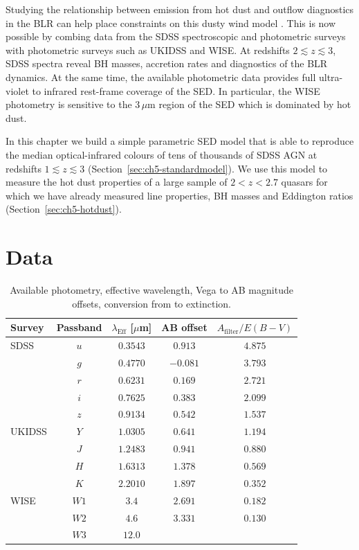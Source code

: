 Studying the relationship between emission from hot dust and outflow diagnostics in the BLR can help place constraints on this dusty wind model \citep[e.g.][]{wang13}. 
This is now possible by combing data from the SDSS spectroscopic and photometric surveys with photometric surveys such as UKIDSS and WISE. 
At redshifts $2\lesssim z \lesssim3$, SDSS spectra reveal BH masses, accretion rates and diagnostics of the BLR dynamics. 
At the same time, the available photometric data provides full ultra-violet to infrared rest-frame coverage of the SED.
In particular, the WISE photometry is sensitive to the 3\,$\mu$m region of the SED which is dominated by hot dust. 

In this chapter we build a simple parametric SED model that is able to reproduce the median optical-infrared colours of tens of thousands of SDSS AGN at redshifts $1 \lesssim z \lesssim 3$ (Section~\ref{sec:ch5-standardmodel}).
We use this model to measure the hot dust properties of a large sample of $2 < z < 2.7$ quasars for which we have already measured  line properties, BH masses and Eddington ratios (Section~\ref{sec:ch5-hotdust}).

\section{Data}

\begin{table}
  \footnotesize
  \centering
  \begin{tabular}{lcccc}
    \hline 
    Survey & Passband & $\lambda_{\text{Eff}}$ [$\mu$m] & AB offset & $A_{\text{filter}}/E(B-V)$ \\
    \hline 
    SDSS & $u$ & $0.3543$ & $ 0.913$ & $4.875$ \\
         & $g$ & $0.4770$ & $-0.081$ & $3.793$ \\
         & $r$ & $0.6231$ & $ 0.169$ & $2.721$ \\
         & $i$ & $0.7625$ & $ 0.383$ & $2.099$ \\
         & $z$ & $0.9134$ & $ 0.542$ & $1.537$ \\
    UKIDSS & $Y$ & $1.0305$ &  $0.641$ & $1.194$ \\
           & $J$ & $1.2483$ &  $0.941$ & $0.880$ \\
           & $H$ & $1.6313$ &  $1.378$ & $0.569$ \\
           & $K$ & $2.2010$ &  $1.897$ & $0.352$ \\
    WISE & $W1$ & $3.4$ & $2.691$ & $0.182$\\
         & $W2$ & $4.6$ & $3.331$ & $0.130$\\
         & $W3$ & $12.0$ & & \\           
    \hline
  \end{tabular}
  \caption[{Available photometry, effective wavelength, Vega to AB magnitude offsets, conversion from \ebv to extinction.}]{Available photometry, effective wavelength, Vega to AB magnitude offsets, conversion from \ebv to extinction. }
  \label{tab:photometry}
\end{table}

